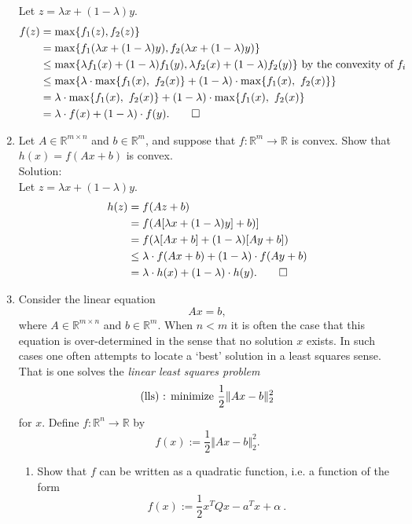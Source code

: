 \documentclass[12pt]{amsart}
\newcommand{\norm}[1]{\Vert #1 \Vert}
\newcommand{\Rn}{\R^n}
\newcommand{\Rm}{\R^m}
\newcommand{\R}{{\mathbb{R}}}
\newcommand{\map}[3]{#1:#2\rightarrow #3}
\newcommand{\half}{\frac{1}{2}}
\newcommand{\Rmn}{\R^{m\times n}}
\newcommand{\tpose}[1]{#1^{\scriptscriptstyle T}}
\begin{document}
\begin{enumerate}
Let $z = \lambda x + (1-\lambda) y$.
\begin{align*}
f(z) &= \max \{f_1(z), f_2(z)\} \\
        &= \max \{f_1(\lambda x + (1-\lambda) y), f_2(\lambda x + (1-\lambda) y)\}  \\
      &\leq \max \{\lambda f_1(x) + (1-\lambda) f_1(y), \lambda f_2(x) + (1-\lambda) f_2(y)\} \text{ by the convexity of } f_i\\
     &\leq \max \{\lambda \cdot \max\{f_1(x),\ f_2(x)\} + (1-\lambda) \cdot \max\{f_1(x),\ f_2(x)\}    \}\\
   & = \lambda \cdot \max\{f_1(x),\ f_2(x)\} + (1-\lambda) \cdot \max\{f_1(x),\ f_2(x)\}\\
   & = \lambda \cdot f(x) + (1-\lambda) \cdot f(y). \qed
\end{align*} 


\item
Let $A\in\R^{m\times n}$ and $b\in\Rm$, and suppose that
$\map{f}{\Rm}{\R}$ is convex. Show that $h(x)=f(Ax+b)$ is convex. \\

\noindent
Solution: \\

Let $z = \lambda x + (1-\lambda) y$.
\begin{align*}
h(z) &= f(Az + b)\\
&= f(A[\lambda x + (1-\lambda) y] + b)]\\
&= f(\lambda[Ax+b] + (1-\lambda)[Ay+b])\\
&\leq \lambda \cdot f(Ax+b) + (1-\lambda) \cdot f(Ay+b)\\
&= \lambda \cdot h(x) + (1-\lambda) \cdot h(y).  \qed
\end{align*}

\item
 Consider the linear equation $$Ax=b,$$ where $A \in \Rmn$
and $b \in \Rm$. When $n<m$ it is often the case that this
equation is over-determined in the sense that no solution $x$
exists. In such cases one often attempts to locate a `best'
solution in a least squares sense. That is one solves the
{\it linear least squares problem}
$$\hbox{(lls) : minimize } \half \norm{Ax-b}^2_2$$
for $x$. Define $\map{f}{\Rn}{\R}$ by
$$f(x):= \half \norm{Ax-b}^2_2.$$
\begin{enumerate}
\item Show that $f$ can be written as a quadratic function, i.e.
a function of the form
$$f(x):=\frac{1}{2} \tpose{x} Q x -\tpose{a}x +\alpha \  .$$


\end{enumerate}
\end{enumerate}
\end{document}
